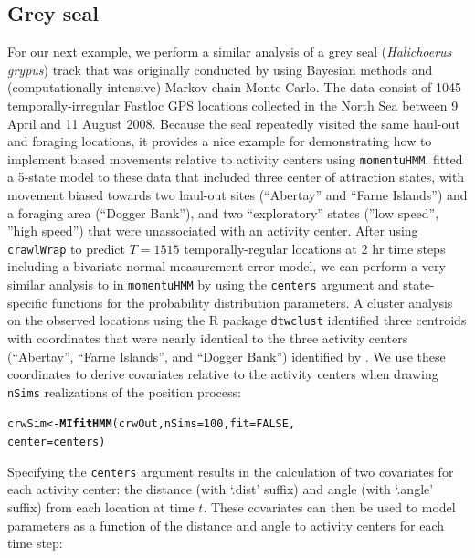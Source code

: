 \documentclass[12pt]{article}\usepackage[]{graphicx}\usepackage[]{xcolor}
\makeatletter
\newcommand{\hlnum}[1]{\textcolor[rgb]{0.686,0.059,0.569}{#1}}%
\newcommand{\hldef}[1]{\textcolor[rgb]{0.345,0.345,0.345}{#1}}%
\newcommand{\hlkwb}[1]{\textcolor[rgb]{0.69,0.353,0.396}{#1}}%
\newcommand{\hlkwc}[1]{\textcolor[rgb]{0.333,0.667,0.333}{#1}}%
\newcommand{\hlkwd}[1]{\textcolor[rgb]{0.737,0.353,0.396}{\textbf{#1}}}%
\newenvironment{kframe}{%
 \def\at@end@of@kframe{}%
 \ifinner\ifhmode%
  \def\at@end@of@kframe{\end{minipage}}%
  \begin{minipage}{\columnwidth}%
 \fi\fi%
 \def\FrameCommand##1{\hskip\@totalleftmargin \hskip-\fboxsep
 \colorbox{shadecolor}{##1}\hskip-\fboxsep
     \hskip-\linewidth \hskip-\@totalleftmargin \hskip\columnwidth}%
 \MakeFramed {\advance\hsize-\width
   \@totalleftmargin\z@ \linewidth\hsize
   \@setminipage}}%
 {\par\unskip\endMakeFramed%
 \at@end@of@kframe}
\newenvironment{knitrout}{}{} %
\makeatother
\begin{document}
\subsection{Grey seal}
\label{sec:greySeal}
For our next example, we perform a similar analysis of a grey seal ({\it Halichoerus grypus}) track that was originally conducted by \cite{McClintockEtAl2012} using Bayesian methods and (computationally-intensive) Markov chain Monte Carlo. The data consist of 1045 temporally-irregular Fastloc GPS locations collected in the North Sea between 9 April and 11 August 2008. Because the seal repeatedly visited the same haul-out and foraging locations, it provides a nice example for demonstrating how to implement biased movements relative to activity centers using \verb|momentuHMM|. \cite{McClintockEtAl2012} fitted a 5-state model to these data that included three center of attraction states, with movement biased towards two haul-out sites (``Abertay'' and ``Farne Islands'') and a foraging area (``Dogger Bank''), and two ``exploratory'' states (''low speed'', ''high speed'') that were unassociated with an activity center. After using \verb|crawlWrap| to predict $T=1515$ temporally-regular locations at 2 hr time steps including a bivariate normal measurement error model, we can perform a very similar analysis to \cite{McClintockEtAl2012} in \verb|momentuHMM| by using the \verb|centers| argument and state-specific functions for the probability distribution parameters. A cluster analysis on the observed locations using the R package \verb|dtwclust| \citep{SardaEspinosa2017} identified three centroids with coordinates that were nearly identical to the three activity centers (``Abertay'', ``Farne Islands'', and ``Dogger Bank'') identified by \cite{McClintockEtAl2012}. We use these coordinates to derive covariates relative to the activity centers when drawing \verb|nSims| realizations of the position process:
\begin{knitrout}
\color{fgcolor}\begin{kframe}
\begin{alltt}
\hldef{crwSim} \hlkwb{<-} \hlkwd{MIfitHMM}\hldef{(crwOut,} \hlkwc{nSims} \hldef{=} \hlnum{100}\hldef{,} \hlkwc{fit}\hldef{=}\hlnum{FALSE}\hldef{,}
                  \hlkwc{center} \hldef{= centers)}
\end{alltt}
\end{kframe}
\end{knitrout}
Specifying the \verb|centers| argument results in the calculation of two covariates for each activity center: the distance (with `.dist' suffix) and angle (with `.angle' suffix) from each location at time $t$. These covariates can then be used to model parameters as a function of the distance and angle to activity centers for each time step:
\end{document}
